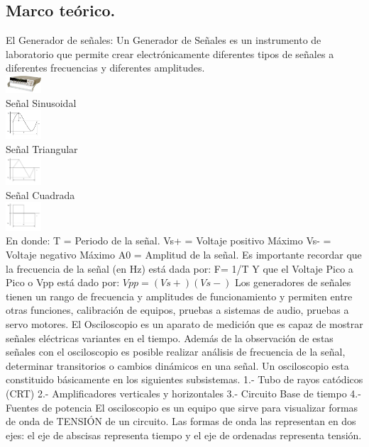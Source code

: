 \documentclass[10pt]{article}
\begin{document}
\begin{multicols}{2}
\section{Marco teórico.}
El Generador de señales: Un Generador de Señales es un instrumento de laboratorio que permite crear electrónicamente diferentes tipos de señales a diferentes frecuencias y diferentes amplitudes. \\
\includegraphics[width=0.1\textwidth]{Imagenes/Marco Teorico/Imagen1}\\
Señal Sinusoidal\\
\includegraphics[width=0.1\textwidth]{Imagenes/Marco Teorico/Imagen2}\\
Señal Triangular\\
\includegraphics[width=0.1\textwidth]{Imagenes/Marco Teorico/Imagen3}\\
Señal Cuadrada\\
\includegraphics[width=0.1\textwidth]{Imagenes/Marco Teorico/Imagen4}\\
En donde:
T = Periodo de la señal. 
Vs+ = Voltaje positivo Máximo
Vs- = Voltaje negativo Máximo
A0 = Amplitud de la señal.
Es importante recordar que la frecuencia de la señal (en Hz) está dada por:
F= 1/T
Y que el Voltaje Pico a Pico o Vpp está dado por:
$ Vpp= (Vs+)  (Vs-) $
Los generadores de señales tienen un rango de frecuencia y amplitudes de funcionamiento y permiten entre otras funciones, calibración de equipos, pruebas a sistemas de audio, pruebas a servo motores.
El Osciloscopio es un aparato de medición que es capaz de mostrar señales eléctricas variantes en el tiempo. Además de la observación de estas señales con el osciloscopio es posible realizar análisis de frecuencia de la señal, determinar transitorios o cambios dinámicos en una señal.
Un osciloscopio esta constituido básicamente en los siguientes subsistemas.
1.- Tubo de rayos catódicos (CRT)
2.- Amplificadores verticales y horizontales
3.- Circuito Base de tiempo
4.-Fuentes de potencia
El osciloscopio es un equipo que sirve para visualizar formas de onda de TENSIÓN de un circuito. Las formas de onda las representan en dos ejes: el eje de abscisas representa tiempo y el eje de ordenadas representa tensión.\\


\end{multicols}
\end{document}
